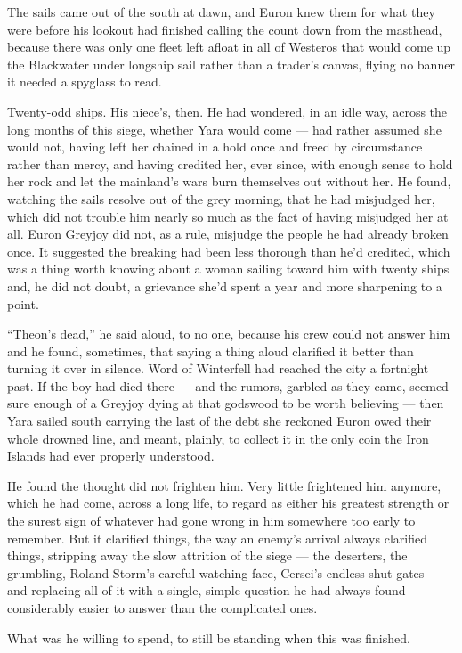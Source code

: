 The sails came out of the south at dawn, and Euron knew them for what they were before his lookout had finished calling the count down from the masthead, because there was only one fleet left afloat in all of Westeros that would come up the Blackwater under longship sail rather than a trader’s canvas, flying no banner it needed a spyglass to read.

Twenty-odd ships. His niece’s, then. He had wondered, in an idle way, across the long months of this siege, whether Yara would come — had rather assumed she would not, having left her chained in a hold once and freed by circumstance rather than mercy, and having credited her, ever since, with enough sense to hold her rock and let the mainland’s wars burn themselves out without her. He found, watching the sails resolve out of the grey morning, that he had misjudged her, which did not trouble him nearly so much as the fact of having misjudged her at all. Euron Greyjoy did not, as a rule, misjudge the people he had already broken once. It suggested the breaking had been less thorough than he’d credited, which was a thing worth knowing about a woman sailing toward him with twenty ships and, he did not doubt, a grievance she’d spent a year and more sharpening to a point.

“Theon’s dead,” he said aloud, to no one, because his crew could not answer him and he found, sometimes, that saying a thing aloud clarified it better than turning it over in silence. Word of Winterfell had reached the city a fortnight past. If the boy had died there — and the rumors, garbled as they came, seemed sure enough of a Greyjoy dying at that godswood to be worth believing — then Yara sailed south carrying the last of the debt she reckoned Euron owed their whole drowned line, and meant, plainly, to collect it in the only coin the Iron Islands had ever properly understood.

He found the thought did not frighten him. Very little frightened him anymore, which he had come, across a long life, to regard as either his greatest strength or the surest sign of whatever had gone wrong in him somewhere too early to remember. But it clarified things, the way an enemy’s arrival always clarified things, stripping away the slow attrition of the siege — the deserters, the grumbling, Roland Storm’s careful watching face, Cersei’s endless shut gates — and replacing all of it with a single, simple question he had always found considerably easier to answer than the complicated ones.

What was he willing to spend, to still be standing when this was finished.

